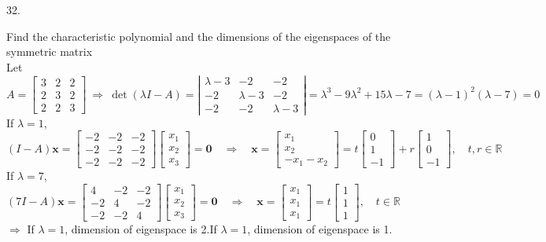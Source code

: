 \documentclass[12pt]{book}
\begin{document}
\begin{CJK}{UTF8}{bsmi}
32. \begin{minipage}[t]{\dimexpr\linewidth}
Find the characteristic polynomial and the dimensions of the eigenspaces of the symmetric matrix \\
Let $A=\begin{bmatrix}
3 & 2 & 2 \\
2 & 3 & 2 \\
2 & 2 & 3
\end{bmatrix}\ \Rightarrow\ \det(\lambda I-A)=\left|\begin{matrix}
\lambda-3 & -2 & -2 \\
-2 & \lambda-3 & -2 \\
-2 & -2 & \lambda-3
\end{matrix}\right|=\lambda^3-9\lambda^2+15\lambda-7=(\lambda-1)^2(\lambda-7)=0$ \\
If $\lambda=1$, $(I-A)\textbf{x}=\begin{bmatrix}
-2 & -2 & -2 \\
-2 & -2 & -2 \\
-2 & -2 & -2
\end{bmatrix}\begin{bmatrix}
x_1 \\ x_2 \\ x_3
\end{bmatrix}=\textbf{0}\quad\Rightarrow\quad\textbf{x}=\begin{bmatrix}
x_1 \\ x_2 \\ -x_1-x_2
\end{bmatrix}=t\begin{bmatrix}
0 \\ 1 \\ -1
\end{bmatrix}+r\begin{bmatrix}
1 \\ 0 \\ -1
\end{bmatrix},\quad t,r\in\mathbb{R}$ \\
If $\lambda=7$, $(7I-A)\textbf{x}=\begin{bmatrix}
 4 & -2 & -2 \\
-2 &  4 & -2 \\
-2 & -2 &  4
\end{bmatrix}\begin{bmatrix}
x_1 \\ x_2 \\ x_3
\end{bmatrix}=\textbf{0}\quad\Rightarrow\quad\textbf{x}=\begin{bmatrix}
x_1 \\ x_1 \\ x_1
\end{bmatrix}=t\begin{bmatrix}
1 \\ 1 \\ 1
\end{bmatrix},\quad t\in\mathbb{R}$ \\
$\Rightarrow$ If $\lambda=1$, dimension of eigenspace is 2.\qquad If $\lambda=1$, dimension of eigenspace is 1.
\end{minipage} \\


\end{CJK}
\end{document}
